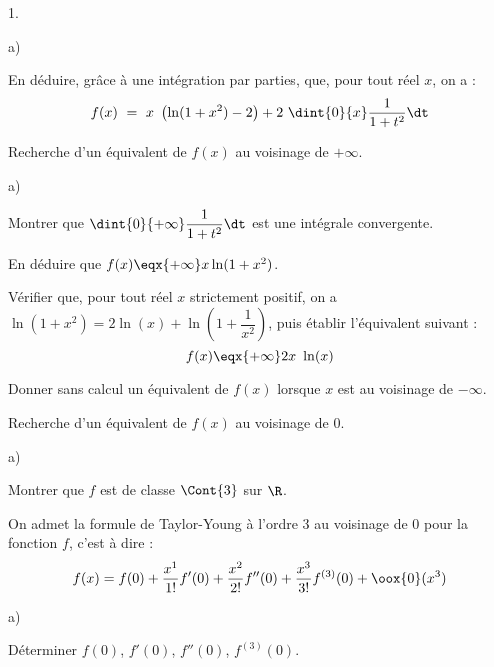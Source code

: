 \begin{noliste}{1.}
\begin{noliste}{a)}
    

  \item En déduire, grâce à une intégration par parties, que, pour
    tout réel $x$, on a :
    \[
    f(x) \ = \ x \ \left( \ln(1 + x^2) - 2 \right) + 2 \ \dint{0}{x}
    \dfrac{1}{1 + t^2} \dt
    \]
    
  \end{noliste}




\item Recherche d'un équivalent de $f(x)$ au voisinage de $+\infty$.
  \begin{noliste}{a)}
    \setlength{\itemsep}{2mm}
  \item Montrer que $\dint{0}{+\infty} \dfrac{1}{1+t^2} \dt$ est une
    intégrale convergente.

    
    
  \item En déduire que $f(x) \eqx{+\infty} x \ln(1 + x^2)$.

    
    
  \item Vérifier que, pour tout réel $x$ strictement positif, on a
    $\ln(1 + x^2) = 2 \ln(x) + \ln \left( 1 + \dfrac{1}{x^2} \right)$,
    puis établir l'équivalent suivant :
    \[
    f(x) \eqx{+\infty} 2x \ \ln(x)
    \]

    

  \item Donner sans calcul un équivalent de $f(x)$ lorsque $x$ est au
    voisinage de $-\infty$.

    

  \end{noliste}

\item Recherche d'un équivalent de $f(x)$ au voisinage de $0$.
  \begin{noliste}{a)}
    \setlength{\itemsep}{2mm}
  \item Montrer que $f$ est de classe $\Cont{3}$ sur $\R$.

    
  \end{noliste}
  On admet la formule de Taylor-Young à l'ordre $3$ au voisinage de
  $0$ pour la fonction $f$, c'est à dire :
  \[
  f(x) = f(0) + \dfrac{x^1}{1!} f'(0) + \dfrac{x^2}{2!} f''(0) +
  \dfrac{x^3}{3!} f^{(3)}(0) + \oox{0} (x^3)
  \]
  \begin{noliste}{a)}
    \setcounter{enumii}{1} %
    \setlength{\itemsep}{2mm}
  \item Déterminer $f(0)$, $f'(0)$, $f''(0)$, $f^{(3)}(0)$.


\end{noliste}
\end{noliste}
